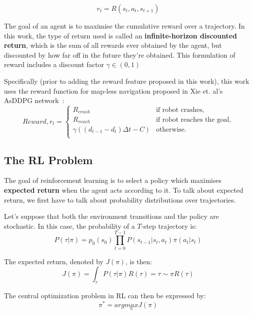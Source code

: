 \begin{equation}
r_{t} = R(s_{t}, a_{t}, s_{t+1})
\end{equation}

The goal of an agent is to maximise the cumulative reward over a trajectory. In this work, the type of return used is called an \textbf{infinite-horizon discounted return}, which is the sum of all rewards ever obtained by the agent, but discounted by how far off in the future they're obtained. This formulation of reward includes a discount factor $\gamma \in (0, 1)$

Specifically (prior to adding the reward feature proposed in this work), this work uses the reward function for map-less navigation proposed in Xie et. al's AsDDPG network~\cite{xie_learning_2018}:
\begin{equation*}
Reward, r_{t} = 
\begin{cases}
  R_{crash}& \text{if robot crashes},\\   
  R_{reach}& \text{if robot reaches the goal},\\  
  \gamma{((d_{t-1} - d_{t})\Delta{t} - C)}& \text{otherwise}.\\  
\end{cases}
\end{equation*}

\subsection{The RL Problem}
The goal of reinforcement learning is to select a policy which maximises \textbf{expected return} when the agent acts according to it. To talk about expected return, we first have to talk about probability distributions over trajectories.

Let’s suppose that both the environment transitions and the policy are stochastic. In this case, the probability of a $T$-step trajectory is:
\begin{equation}
P(\tau|\pi) = p_{0}(s_{0}) \prod_{t=0}^{T-1} P(s_{t-1}|s_{t}, a_{t}) \pi(a_{t}|s_{t})
\end{equation}

The expected return, denoted by $J(\pi)$, is then:
\begin{equation}
J(\pi) = \int_{\tau} P(\tau|\pi) R(\tau) = \tau \sim \pi R(\tau)
\end{equation}

The central optimization problem in RL can then be expressed by:
\begin{equation}
\pi^{*} = arg \underset{\pi}{max} J(\pi)
\end{equation}

